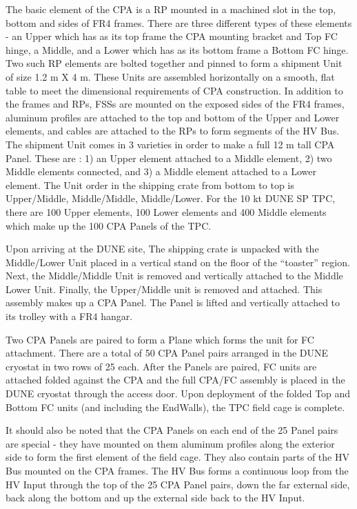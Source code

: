 The basic element of the CPA is a RP mounted in a machined slot in the top, bottom and sides of FR4 frames.  There are three different types of these elements - an Upper which has as its top frame the CPA mounting bracket and Top FC hinge, a Middle, and a Lower which has as its bottom frame a Bottom FC hinge.  Two such RP elements are bolted together and pinned to form a shipment Unit of size 1.2 m X 4 m.  These Units are assembled horizontally on a smooth, flat table to meet the dimensional requirements of CPA construction.  In addition to the frames and RPs, FSSs are mounted on the exposed sides of the FR4 frames, aluminum profiles are attached to the top and bottom of the Upper and Lower elements, and cables are attached to the RPs to form segments of the HV Bus.  The shipment Unit comes in 3 varieties in order to make a full 12 m tall CPA Panel.  These are : 1) an Upper element attached to a Middle element, 2) two Middle elements connected, and 3) a Middle element attached to a Lower element.  The Unit order in the shipping crate from bottom to top is Upper/Middle, Middle/Middle, Middle/Lower.  For the 10 kt DUNE SP TPC, there are 100 Upper elements, 100 Lower elements and 400 Middle elements which make up the 100 CPA Panels of the TPC.

Upon arriving at the DUNE site, The shipping crate is unpacked with the Middle/Lower Unit placed in a vertical stand on the floor of the ``toaster'' region.  Next, the Middle/Middle Unit is removed and vertically attached to the Middle Lower Unit.  Finally, the Upper/Middle unit is removed and attached.  This assembly makes up a CPA Panel.  The Panel is lifted and vertically attached to its trolley with a FR4 hangar.

Two CPA Panels are paired to form a Plane which forms the unit for FC attachment.  There are a total of 50 CPA Panel pairs arranged in the DUNE cryostat in two rows of 25 each.  After the Panels are paired, FC units are attached folded against the CPA and the full CPA/FC assembly is placed in the DUNE cryostat through the access door.  Upon deployment of the folded Top and Bottom FC units (and including the EndWalls), the TPC field cage is complete.

It should also be noted that the CPA Panels on each end of the 25 Panel pairs are special - they have mounted on them aluminum profiles along the exterior side to form the first element of the field cage.  They also contain parts of the HV Bus mounted on the CPA frames.  The HV Bus forms a continuous loop from the HV Input through the top of the 25 CPA Panel pairs, down the far external side, back along the bottom and up the  external side back to the HV Input.

